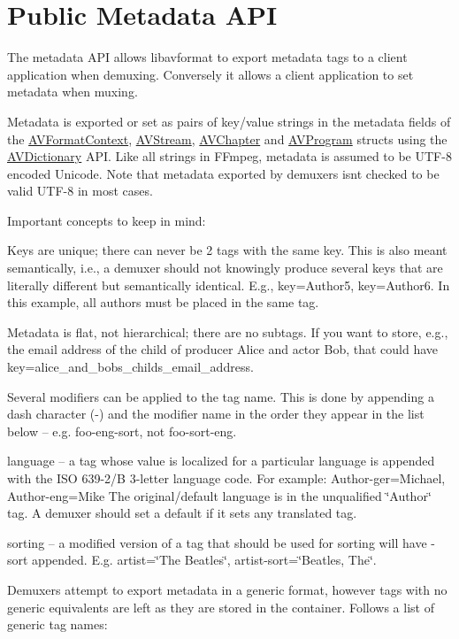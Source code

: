 \hypertarget{group__metadata__api}{}\section{Public Metadata A\+PI}
\label{group__metadata__api}
The metadata A\+PI allows libavformat to export metadata tags to a client application when demuxing. Conversely it allows a client application to set metadata when muxing.

Metadata is exported or set as pairs of key/value strings in the \textquotesingle{}metadata\textquotesingle{} fields of the \hyperlink{struct_a_v_format_context}{A\+V\+Format\+Context}, \hyperlink{struct_a_v_stream}{A\+V\+Stream}, \hyperlink{struct_a_v_chapter}{A\+V\+Chapter} and \hyperlink{struct_a_v_program}{A\+V\+Program} structs using the \hyperlink{group__lavu__dict}{A\+V\+Dictionary} A\+PI. Like all strings in F\+Fmpeg, metadata is assumed to be U\+T\+F-\/8 encoded Unicode. Note that metadata exported by demuxers isn\textquotesingle{}t checked to be valid U\+T\+F-\/8 in most cases.

Important concepts to keep in mind\+:
\begin{DoxyItemize}
\item Keys are unique; there can never be 2 tags with the same key. This is also meant semantically, i.\+e., a demuxer should not knowingly produce several keys that are literally different but semantically identical. E.\+g., key=Author5, key=Author6. In this example, all authors must be placed in the same tag.
\item Metadata is flat, not hierarchical; there are no subtags. If you want to store, e.\+g., the email address of the child of producer Alice and actor Bob, that could have key=alice\+\_\+and\+\_\+bobs\+\_\+childs\+\_\+email\+\_\+address.
\item Several modifiers can be applied to the tag name. This is done by appending a dash character (\textquotesingle{}-\/\textquotesingle{}) and the modifier name in the order they appear in the list below -- e.\+g. foo-\/eng-\/sort, not foo-\/sort-\/eng.
\begin{DoxyItemize}
\item language -- a tag whose value is localized for a particular language is appended with the I\+SO 639-\/2/B 3-\/letter language code. For example\+: Author-\/ger=Michael, Author-\/eng=Mike The original/default language is in the unqualified \char`\"{}\+Author\char`\"{} tag. A demuxer should set a default if it sets any translated tag.
\item sorting -- a modified version of a tag that should be used for sorting will have \textquotesingle{}-\/sort\textquotesingle{} appended. E.\+g. artist=\char`\"{}\+The Beatles\char`\"{}, artist-\/sort=\char`\"{}\+Beatles, The\char`\"{}.
\end{DoxyItemize}
\item Demuxers attempt to export metadata in a generic format, however tags with no generic equivalents are left as they are stored in the container. Follows a list of generic tag names\+:
\end{DoxyItemize}

